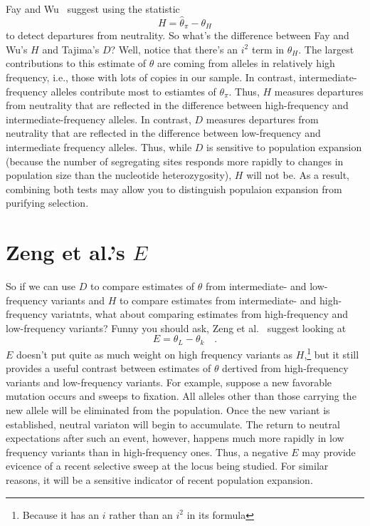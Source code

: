 Fay and Wu~\cite{Fay-Wu-2000} suggest using the statistic
\[
H = \hat\theta_\pi - \theta_H 
\]
to detect departures from neutrality. So what's the difference between
Fay and Wu's $H$ and Tajima's $D$?  Well, notice that there's an $i^2$
term in $\theta_H$. The largest contributions to this estimate of
$\theta$ are coming from alleles in relatively high frequency, i.e.,
those with lots of copies in our sample. In contrast,
intermediate-frequency alleles contribute most to estiamtes of
$\theta_\pi$. Thus, $H$ measures departures from neutrality that are
reflected in the difference between high-frequency and
intermediate-frequency alleles. In contrast, $D$ measures departures
from neutrality that are reflected in the difference between
low-frequency and intermediate frequency alleles.  Thus, while $D$ is
sensitive to population expansion (because the number of segregating
sites responds more rapidly to changes in population size than the
nucleotide heterozygosity), $H$ will not be. As a result, combining
both tests may allow you to distinguish populaion expansion from
purifying selection.

\section*{Zeng et al.'s $E$}

So if we can use $D$ to compare estimates of $\theta$ from
intermediate- and low-frequency variants and $H$ to compare estimates
from intermediate- and high-frequency variatnts, what about comparing
estimates from high-frequency and low-frequency variants? Funny you
should ask, Zeng et al.~\cite{Zeng-etal-2006} suggest looking at
\[
E = \theta_L - \theta_k \quad . 
\]
$E$ doesn't put quite as much weight on high frequency variants as
$H$,\footnote{Because it has an $i$ rather than an $i^2$ in its
  formula} but it still provides a useful contrast between estimates
of $\theta$ dertived from high-frequency variants and low-frequency
variants. For example, suppose a new favorable mutation occurs and
sweeps to fixation. All alleles other than those carrying the new
allele will be eliminated from the population. Once the new variant is
established, neutral variaton will begin to accumulate. The return to
neutral expectations after such an event, however, happens much more
rapidly in low frequency variants than in high-frequency ones. Thus, a
negative $E$ may provide evicence of a recent selective sweep at the
locus being studied. For similar reasons, it will be a sensitive
indicator of recent population expansion.

